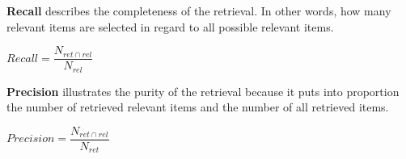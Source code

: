 \pagebreak

\noindent
\textbf{Recall} describes the completeness of the retrieval. In other words, how many relevant items are selected in regard to all possible relevant items.

\begin{centering}
	\vspace{1cm}
	
	$Recall=\dfrac{N_{ret\cap rel}}{ N_{rel} }  $
	
	\vspace{1cm}
\end{centering} 

\noindent
\textbf{Precision} illustrates the purity of the retrieval because it puts into proportion the number of retrieved relevant items and the number of all retrieved items.

\begin{centering}
	\vspace{1cm}
	
	$Precision=\dfrac{N_{ret\cap rel}}{ N_{ret} }  $
	
	\vspace{1cm}
\end{centering} 

